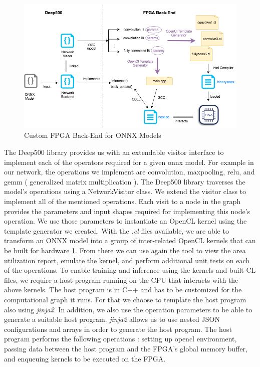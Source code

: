 \begin{figure}[h!]
\centering
\includegraphics[width=1.0\textwidth]{Figures/integration}
\decoRule
\caption[integration]{ Custom FPGA Back-End for ONNX Models }
\label{fig:integration}
\end{figure}

The Deep500 library provides us with an extendable visitor interface to implement each of the operators required for a given onnx model. For example in our network, the operations we implement are convolution, maxpooling, relu, and gemm ( generalized matrix multiplication ). The Deep500 library traverses the model’s operations using a NetworkVisitor class. We extend the visitor class to implement all of the mentioned operations. Each visit to a node in the graph provides the parameters and input shapes required for implementing this node's operation. We use those parameters to instantiate an OpenCL kernel using the template generator we created. With the \emph{.cl} files available, we are able to transform an ONNX model into a group of inter-related OpenCL kernels that can be built for hardware \ref{fig:integration}. From there we can use again the tool to view the area utilization report, emulate the kernel, and perform additional unit tests on each of the operations.
To enable training and inference using the kernels and built CL files, we require a host program running on the CPU that interacts with the above kernels. The host program is in C++ and has to be customized for the computational graph it runs. For that we choose to template the host program also using  \emph{jinja2}. In addition, we also use the operation parameters to be able to generate a suitable host program.  
\emph{jinja2} allows us to use nested JSON configurations and arrays in order to generate the host program. The host program performs the following operations : setting up opencl environment, passing data between the host program and the FPGA's global memory buffer, and enqueuing kernels to be executed on the FPGA.


